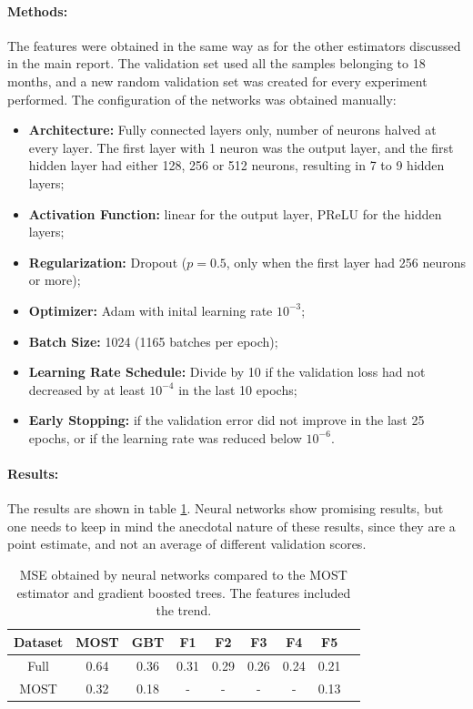 \documentclass[a4paper,11pt]{kth-mag}
\begin{document}
\paragraph{Methods:}
The features were obtained in the same way as for the other estimators discussed in the main report. The validation set used all the samples belonging to 18 months, and a new random validation set was created for every experiment performed. The configuration of the networks was obtained manually:

\begin{itemize}
\item \textbf{Architecture:} Fully connected layers only, number of neurons halved at every layer. The first layer with 1 neuron was the output layer, and the first hidden layer had either 128, 256 or 512 neurons, resulting in 7 to 9 hidden layers;
\item \textbf{Activation Function:} linear for the output layer, PReLU \citep{prelu} for the hidden layers;
\item \textbf{Regularization:} Dropout ($p=0.5$, only when the first layer had 256 neurons or more);
\item \textbf{Optimizer:} Adam \citep{adam} with inital learning rate $10^{-3}$;
\item \textbf{Batch Size:} 1024 (1165 batches per epoch);
\item \textbf{Learning Rate Schedule:} Divide by 10 if the validation loss had not decreased by at least $10^{-4}$ in the last 10 epochs;
\item \textbf{Early Stopping:} if the validation error did not improve in the last 25 epochs, or if the learning rate was reduced below $10^{-6}$.
\end{itemize}

\paragraph{Results:}
The results are shown in table \ref{tbl:nnets}. Neural networks show promising results, but one needs to keep in mind the anecdotal nature of these results, since they are a point estimate, and not an average of different validation scores.

\begin{table}
\caption{MSE obtained by neural networks compared to the MOST estimator and gradient boosted trees. The features included the trend.}
\label{tbl:nnets}
\centering
\begin{tabular}{ccc|cccccc}
\toprule
\textbf{Dataset} & \textbf{MOST} & \textbf{GBT} & \textbf{F1} & \textbf{F2} & \textbf{F3} & \textbf{F4} & \textbf{F5} \\
\midrule
Full & 0.64 & 0.36 & 0.31 & 0.29 & 0.26 & 0.24 & 0.21 \\
MOST & 0.32 & 0.18 & - & - & - & - & 0.13 \\
\bottomrule
\end{tabular}
\end{table}
\end{document}
